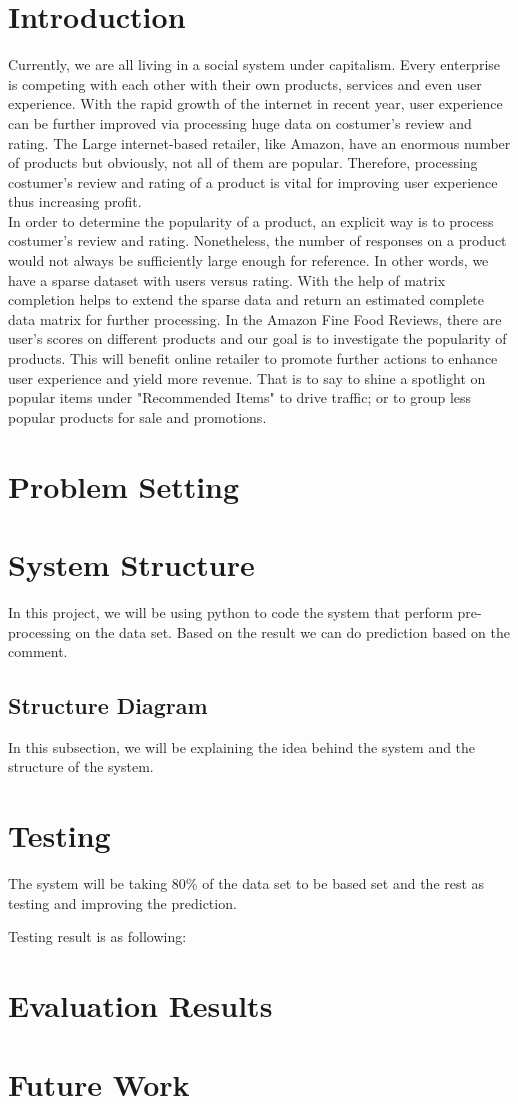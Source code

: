 \section{Introduction}
Currently, we are all living in a social system under capitalism. Every enterprise is competing with each other with their own products, services and even user experience. With the rapid growth of the internet in recent year, user experience can be further improved via processing huge data on costumer's review and rating. The Large internet-based retailer, like Amazon, have an enormous number of products but obviously, not all of them are popular. Therefore, processing costumer's review and rating of a product is vital for improving user experience thus increasing profit.\\

In order to determine the popularity of a product, an explicit way is to process costumer's review and rating. Nonetheless, the number of responses on a product would not always be sufficiently large enough for reference. In other words, we have a sparse dataset with users versus rating. With the help of matrix completion helps to extend the sparse data and return an estimated complete data matrix for further processing. In the Amazon Fine Food Reviews, there are user's scores on different products and our goal is to investigate the popularity of products. This will benefit online retailer to promote further actions to enhance user experience and yield more revenue. That is to say to shine a spotlight on popular items under "Recommended Items" to drive traffic; or to group less popular products for sale and promotions.


\section{Problem Setting}

\section{System Structure}
In this project, we will be using python to code the system that perform pre-processing on the data set. Based on the result we can do prediction based on the comment.
\subsection{Structure Diagram}
In this subsection, we will be explaining the idea behind the system and the structure of the system.

\section{Testing}
The system will be taking 80\% of the data set to be based set and the rest as testing and improving the prediction.

Testing result is as following:
\section{Evaluation Results}

\section{Future Work}
